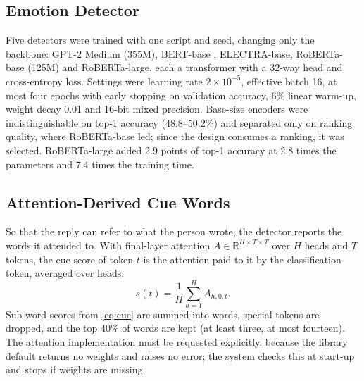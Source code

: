 \subsection{Emotion Detector}
Five detectors were trained with one script and seed, changing only the backbone: GPT-2 Medium (355M), BERT-base \cite{devlin2019}, ELECTRA-base, RoBERTa-base \cite{liu2019roberta} (125M) and RoBERTa-large, each a transformer \cite{vaswani2017} with a 32-way head and cross-entropy loss. Settings were learning rate $2\times10^{-5}$, effective batch 16, at most four epochs with early stopping on validation accuracy, 6\% linear warm-up, weight decay 0.01 and 16-bit mixed precision. Base-size encoders were indistinguishable on top-1 accuracy (48.8--50.2\%) and separated only on ranking quality, where RoBERTa-base led; since the design consumes a ranking, it was selected. RoBERTa-large added 2.9 points of top-1 accuracy at 2.8 times the parameters and 7.4 times the training time.

\subsection{Attention-Derived Cue Words}
So that the reply can refer to what the person wrote, the detector reports the words it attended to. With final-layer attention $A\in\mathbb{R}^{H\times T\times T}$ over $H$ heads and $T$ tokens, the cue score of token $t$ is the attention paid to it by the classification token, averaged over heads:
\begin{equation}
s(t)=\frac{1}{H}\sum_{h=1}^{H}A_{h,0,t}.\label{eq:cue}
\end{equation}
Sub-word scores from \eqref{eq:cue} are summed into words, special tokens are dropped, and the top 40\% of words are kept (at least three, at most fourteen). The attention implementation must be requested explicitly, because the library default returns no weights and raises no error; the system checks this at start-up and stops if weights are missing.

